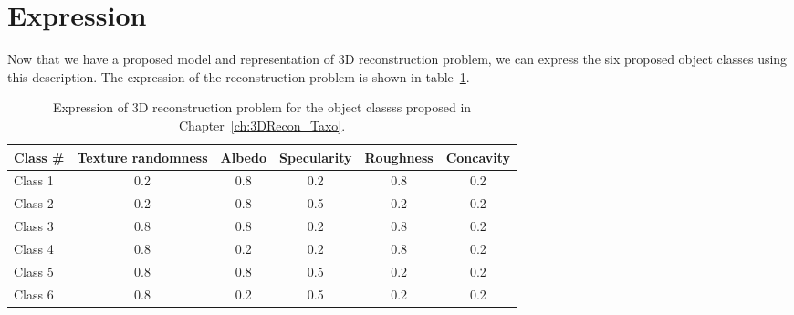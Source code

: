 \section{Expression}
\label{sec:3DRecon_Exp}
Now that we have a proposed model and representation of 3D reconstruction problem, we can express the six proposed object classes using this description. The expression of the reconstruction problem is shown in table~\ref{tab:express}.
\begin{table}[!htbp]
  \centering
  \begin{tabular}{l*{5}{c}}
  \hline
  \textbf{Class \#} & Texture randomness & Albedo & Specularity & Roughness & Concavity\\
  \hline
  Class 1 & 0.2 & 0.8 & 0.2 & 0.8 & 0.2\\
  Class 2 & 0.2 & 0.8 & 0.5 & 0.2 & 0.2\\
  Class 3 & 0.8 & 0.8 & 0.2 & 0.8 & 0.2\\
  Class 4 & 0.8 & 0.2 & 0.2 & 0.8 & 0.2\\
  Class 5 & 0.8 & 0.8 & 0.5 & 0.2 & 0.2\\
  Class 6 & 0.8 & 0.2 & 0.5 & 0.2 & 0.2\\
  \hline
  \end{tabular}
  \caption{Expression of 3D reconstruction problem for the object classss proposed in Chapter~\ref{ch:3DRecon_Taxo}.}
  \label{tab:express}
\end{table}